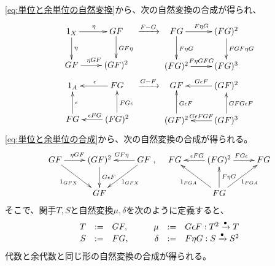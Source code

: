 {	\eqref{eq:単位と余単位の自然変換}から、次の自然変換の合成が得られ、
	\begin{equation*}\begin{split}
		\xymatrix{
			1_X \ar[r]^{\eta} \ar[d]^{\eta} & GF \ar[d]^{GF\eta} \\
			GF \ar[r]^{\eta GF} & (GF)^2 \\
		} &\xto{F-G} \xymatrix{
			FG \ar[r]^{F\eta G} \ar[d]^{F\eta G} & (FG)^2 \ar[d]^{FGF\eta G} \\
			(FG)^2 \ar[r]^{F\eta GFG} & (FG)^3 \\
		} \\
		\xymatrix{
			1_A \ar@{<-}[r]^{\epsilon} \ar@{<-}[d]^{\epsilon} 
			& FG \ar@{<-}[d]^{FG\epsilon} \\
			FG \ar@{<-}[r]^{\epsilon FG} & (FG)^2 \\
		} &\xto{G-F} \xymatrix{
			GF \ar@{<-}[r]^{G\epsilon F} \ar@{<-}[d]^{G\epsilon F} 
			& (GF)^2 \ar@{<-}[d]^{GFG\epsilon F} \\
			(GF)^2 \ar@{<-}[r]^{G\epsilon FGF} & (GF)^3 \\
		}
	\end{split}\end{equation*}
	\eqref{eq:単位と余単位の合成}から、次の自然変換の合成が得られる。
	\begin{equation*}\begin{split}
		\xymatrix{
			GF \ar[r]^{\eta GF} \ar[dr]_{1_{GFX}} 
			& (GF)^2 \ar[d]^{G\epsilon F}
			& GF \ar[l]_{GF\eta} \ar[dl]^{1_{GFX}} \\
			& GF
		},\quad \xymatrix{
			FG \ar@{<-}[r]^{\epsilon FG} \ar@{<-}[dr]_{1_{FGA}} 
			& (FG)^2 \ar@{<-}[d]^{F\eta G}
			& FG \ar@{<-}[l]_{FG\epsilon} \ar@{<-}[dl]^{1_{FGA}} \\
			& FG
		}
	\end{split}\end{equation*}
	そこで、関手$T,S$と自然変換$\mu,\delta$を次のように定義すると、
	\begin{equation}\begin{array}{rclcrcl}
		T &:=& GF, &\quad& \mu &:=& G\epsilon F: T^2\xrightarrow[{}]{\bullet} T \\
		S &:=& FG, &\quad& \delta &:=& F\eta G: S\xrightarrow[{}]{\bullet} S^2 \\
	\end{array}\end{equation}
	代数と余代数と同じ形の自然変換の合成が得られる。
	\begin{equation}\label{eq:モナドの定義}\begin{split}

\end{split}
\end{equation}}
